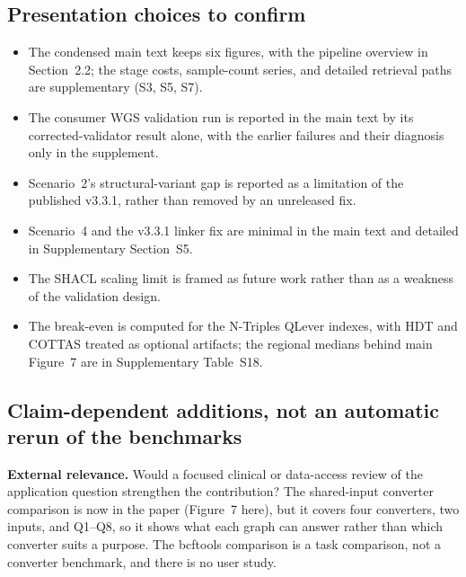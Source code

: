\documentclass[10pt]{article}
\begin{document}
\subsection{Presentation choices to confirm}
\begin{itemize}
\item The condensed main text keeps six figures, with the pipeline overview in Section~2.2; the stage costs, sample-count series, and detailed retrieval paths are supplementary (S3, S5, S7).
\item The consumer WGS validation run is reported in the main text by its corrected-validator result alone, with the earlier failures and their diagnosis only in the supplement.
\item Scenario~2's structural-variant gap is reported as a limitation of the published v3.3.1, rather than removed by an unreleased fix.
\item Scenario~4 and the v3.3.1 linker fix are minimal in the main text and detailed in Supplementary Section~S5.
\item The SHACL scaling limit is framed as future work rather than as a weakness of the validation design.
\item The break-even is computed for the N-Triples QLever indexes, with HDT and COTTAS treated as optional artifacts; the regional medians behind main Figure~7 are in Supplementary Table~S18.
\end{itemize}

\subsection{Claim-dependent additions, not an automatic rerun of the benchmarks}
\textbf{External relevance.} Would a focused clinical or data-access review of the application question strengthen the contribution? The shared-input converter comparison is now in the paper (Figure~7 here), but it covers four converters, two inputs, and Q1--Q8, so it shows what each graph can answer rather than which converter suits a purpose. The bcftools comparison is a task comparison, not a converter benchmark, and there is no user study.
\end{document}
